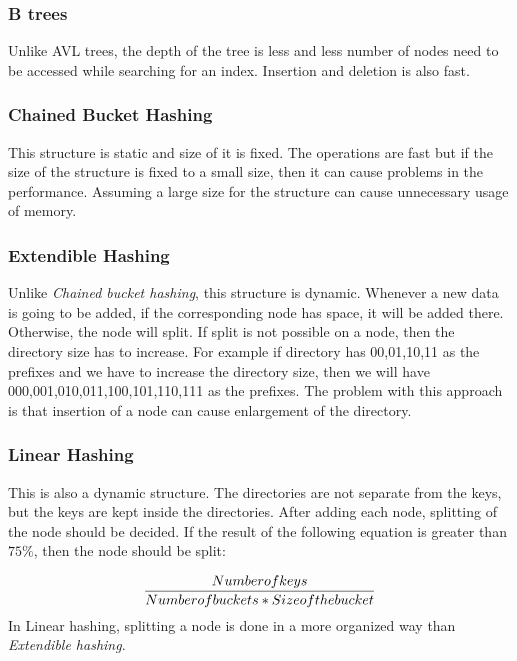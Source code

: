 \documentclass[12pt]{report}
\begin{document}
\subsubsection{B trees}

Unlike AVL trees, the depth of the tree is less and less number of nodes need to be accessed while searching for an index. Insertion and deletion is also fast.

\subsubsection{Chained Bucket Hashing}

This structure is static and size of it is fixed. The operations are fast but if the size of the structure is fixed to a small size, then it can cause problems in the performance. Assuming a large size for the structure can cause unnecessary usage of memory.

\subsubsection{Extendible Hashing}

Unlike \textit{Chained bucket hashing}, this structure is dynamic. Whenever a new data is going to be added, if the corresponding node has space, it will be added there. Otherwise, the node will split. If split is not possible on a node, then the directory size has to increase. For example if directory has 00,01,10,11 as the prefixes and we have to increase the directory size, then we will have 000,001,010,011,100,101,110,111 as the prefixes. The problem with this approach is that insertion of a node can cause enlargement of the directory.  

\subsubsection{Linear Hashing}

This is also a dynamic structure. The directories are not separate from the keys, but the keys are kept inside the directories. After adding each node,  splitting of the node should be decided. If the result of the following equation is greater than $75\%$, then the node should be split:

\begin{equation}
\frac{Number of keys}{Number of buckets * Size of the bucket} \\
\end{equation}   
In Linear hashing, splitting a node is done in a more organized way than \textit{Extendible hashing}.
\end{document}
